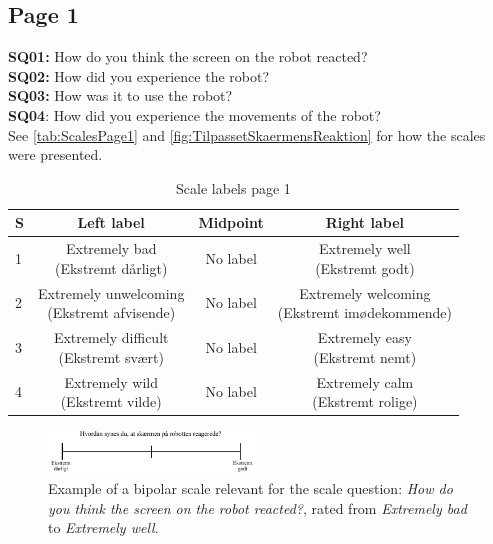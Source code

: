 \subsection{Page 1}
\noindent
\textbf{SQ01:} How do you think the screen on the robot reacted? \\%
\textbf{SQ02:} How did you experience the robot? \\ %
\textbf{SQ03:} How was it to use the robot?\\%
\textbf{SQ04}: How did you experience the movements of the robot? \\%
See \autoref{tab:ScalesPage1} and \autoref{fig:TilpassetSkaermensReaktion} for how the scales were presented.
\begin{table}[H]
	\centering
\caption{Scale labels page 1}
	\label{tab:ScalesPage1} 
	\begin{tabular}{l|c|c|c}
		S     & Left label & Midpoint & Right label \\\hline
		1   & \makecell{Extremely bad\\(Ekstremt dårligt)}  & No label & \makecell{Extremely well \\(Ekstremt godt)}        \\\hline
		2   & \makecell{Extremely unwelcoming \\(Ekstremt afvisende)} & No label & \makecell{Extremely welcoming \\(Ekstremt imødekommende)}         \\\hline
		3   & \makecell{Extremely difficult \\(Ekstremt svært)} & No label & \makecell{Extremely easy \\(Ekstremt nemt)}         \\\hline
	 	4   & \makecell{Extremely wild \\(Ekstremt vilde)} & No label & \makecell{Extremely calm \\(Ekstremt rolige)}               
	\end{tabular}        
\end{table}
\noindent
%
\begin{figure}[H]
\centering
\includegraphics[width = 0.49\textwidth]{Figure/TilpassetSkaermensReaktion}
\setlength{} 
\caption{Example of a bipolar scale relevant for the scale question: \textit{How do you think the screen on the robot reacted?}, rated from \textit{Extremely bad} to \textit{Extremely well}.}
\label{fig:TilpassetSkaermensReaktion}
\end{figure}
\noindent
% 
